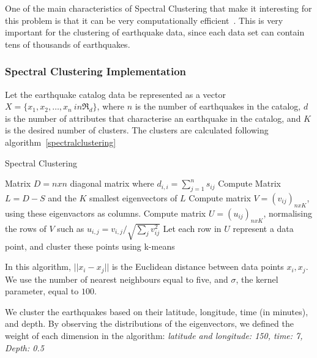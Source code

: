 One of the main characteristics of Spectral Clustering that make it
interesting for this problem is that it can be very computationally
efficient~\cite{Ye2016}. This is very important for the clustering of
earthquake data, since each data set can contain tens of thousands of
earthquakes.

\subsubsection*{Spectral Clustering Implementation}

Let the earthquake catalog data be represented as a vector $X = \{x_1,
x_2, \ldots, x_n\ in \Re_d\}$, where $n$ is the number of earthquakes
in the catalog, $d$ is the number of attributes that characterise an
earthquake in the catalog, and $K$ is the desired number of
clusters. The clusters are calculated following
algorithm~\ref{spectralclustering}

\begin{algorithm}[H]
  \caption{Spectral Clustering}
  \label{spectralclustering}
  \begin{algorithmic}
    \ENDFOR
    \STATE Matrix $D = n x n$ diagonal matrix where $d_{i,i} = \sum^n_{j=1}s_{ij}$
    \STATE Compute Matrix $L = D - S$ and the $K$ smallest eigenvectors of $L$
    \STATE Compute matrix $V = (v_{ij})_{nxK}$, using these eigenvactors as columns.
    \STATE Compute matrix $U = (u_{ij})_{nxK}$, normalising the rows
    of $V$ such as $u_{i,j} = v_{i,j}/\sqrt{\sum_jv^2_{ij}}$
    \STATE Let each row in $U$ represent a data point, and cluster
    these points using k-means
  \end{algorithmic}
\end{algorithm}

In this algorithm, $||x_i-x_j||$ is the Euclidean distance between
data points $x_i,x_j$. We use the number of nearest neighbours equal to
five, and $\sigma$, the kernel parameter, equal to $100$.

We cluster the earthquakes based on their latitude, longitude, time
(in minutes), and depth. By observing the distributions of the
eigenvectors, we defined the weight of each dimension in the
algorithm: \emph{latitude and longitude: 150, time: 7, Depth: 0.5}
